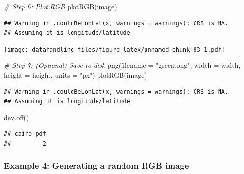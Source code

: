 \documentclass[
  12pt,
]{style/krantz}
\newenvironment{Shaded}{\begin{snugshade}}{\end{snugshade}}
\newcommand{\AttributeTok}[1]{\textcolor[rgb]{0.77,0.63,0.00}{#1}}
\newcommand{\CommentTok}[1]{\textcolor[rgb]{0.56,0.35,0.01}{\textit{#1}}}
\newcommand{\FunctionTok}[1]{\textcolor[rgb]{0.00,0.00,0.00}{#1}}
\newcommand{\NormalTok}[1]{#1}
\newcommand{\StringTok}[1]{\textcolor[rgb]{0.31,0.60,0.02}{#1}}
\begin{document}
\begin{Shaded}
\begin{Highlighting}[]
\CommentTok{\# Step 6: Plot RGB}
\FunctionTok{plotRGB}\NormalTok{(image)}
\end{Highlighting}
\end{Shaded}

\begin{verbatim}
## Warning in .couldBeLonLat(x, warnings = warnings): CRS is NA.
## Assuming it is longitude/latitude
\end{verbatim}

\texttt{[image: datahandling\_files/figure-latex/unnamed-chunk-83-1.pdf]}

\begin{Shaded}
\begin{Highlighting}[]
\CommentTok{\# Step 7: (Optional) Save to disk}
\FunctionTok{png}\NormalTok{(}\AttributeTok{filename =} \StringTok{"green.png"}\NormalTok{, }\AttributeTok{width =}\NormalTok{ width, }\AttributeTok{height =}\NormalTok{ height, }\AttributeTok{units =} \StringTok{"px"}\NormalTok{)}
\FunctionTok{plotRGB}\NormalTok{(image)}
\end{Highlighting}
\end{Shaded}

\begin{verbatim}
## Warning in .couldBeLonLat(x, warnings = warnings): CRS is NA.
## Assuming it is longitude/latitude
\end{verbatim}

\begin{Shaded}
\begin{Highlighting}[]
\FunctionTok{dev.off}\NormalTok{()}
\end{Highlighting}
\end{Shaded}

\begin{verbatim}
## cairo_pdf 
##         2
\end{verbatim}

\hypertarget{example-4-generating-a-random-rgb-image}{%
\subsubsection{Example 4: Generating a random RGB image}\label{example-4-generating-a-random-rgb-image}}
\end{document}
